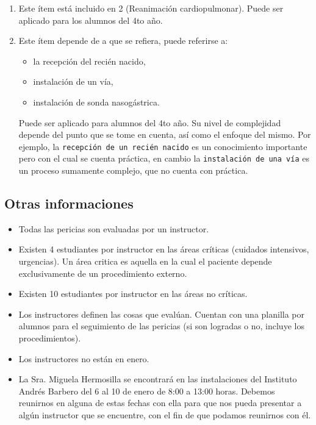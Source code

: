 \begin{enumerate}
\def\labelenumi{\arabic{enumi}.}
\itemsep1pt\parskip0pt
\item
  Este ítem está incluido en 2 (Reanimación cardiopulmonar). Puede ser
  aplicado para los alumnos del 4to año.
\item
  Este ítem depende de a que se refiera, puede referirse a:

  \begin{itemize}
  \itemsep1pt\parskip0pt
  \item
    la recepción del recién nacido,
  \item
    instalación de un vía,
  \item
    instalación de sonda nasogástrica.
  \end{itemize}

  Puede ser aplicado para alumnos del 4to año. Su nivel de complejidad
  depende del punto que se tome en cuenta, así como el enfoque del
  mismo. Por ejemplo, la \texttt{recepción de un recién nacido} es un
  conocimiento importante pero con el cual se cuenta práctica, en cambio
  la \texttt{instalación de una vía} es un proceso sumamente complejo,
  que no cuenta con práctica.
\end{enumerate}

\subsection{Otras informaciones}

\begin{itemize}
\itemsep1pt\parskip0pt
\item
  Todas las pericias son evaluadas por un instructor.
\item
  Existen 4 estudiantes por instructor en las áreas críticas (cuidados
  intensivos, urgencias). Un área critica es aquella en la cual el
  paciente depende exclusivamente de un procedimiento externo.
\item
  Existen 10 estudiantes por instructor en las áreas no críticas.
\item
  Los instructores definen las cosas que evalúan. Cuentan con una
  planilla por alumnos para el seguimiento de las pericias (si son
  logradas o no, incluye los procedimientos).
\item
  Los instructores no están en enero.
\item
  La Sra. Miguela Hermosilla se encontrará en las instalaciones del
  Instituto Andrés Barbero del 6 al 10 de enero de 8:00 a 13:00 horas.
  Debemos reunirnos en alguna de estas fechas con ella para que nos
  pueda presentar a algún instructor que se encuentre, con el fin de que
  podamos reunirnos con él.
\end{itemize}

